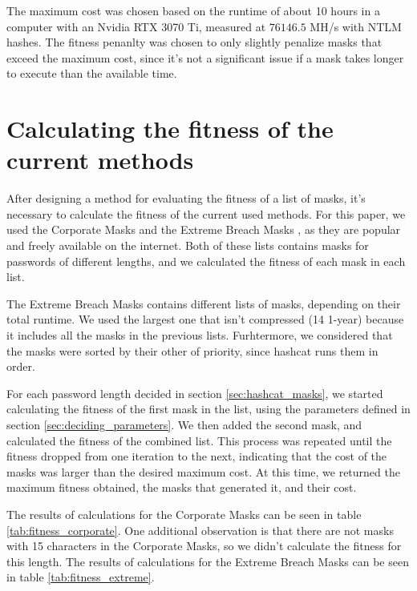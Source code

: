 \documentclass[sigconf,authordraft]{acmart}
\begin{document}
The maximum cost was chosen based on the runtime of about 10 hours in a computer with an Nvidia RTX 3070 Ti, measured at $76146.5$ MH/s with NTLM hashes.
The fitness penanlty was chosen to only slightly penalize masks that exceed the maximum cost, since it's not a significant issue if a mask takes longer to execute than the available time.

\section{Calculating the fitness of the current methods}
\label{sec:calculating_baseline_fitness}

After designing a method for evaluating the fitness of a list of masks, it's necessary to calculate the fitness of the current used methods.
For this paper, we used the Corporate Masks \cite{corporate_masks} and the Extreme Breach Masks \cite{extreme_breach_masks}, as they are popular and freely available on the internet.
Both of these lists contains masks for passwords of different lengths, and we calculated the fitness of each mask in each list.

The Extreme Breach Masks contains different lists of masks, depending on their total runtime.
We used the largest one that isn't compressed (14 1-year) because it includes all the masks in the previous lists.
Furhtermore, we considered that the masks were sorted by their other of priority, since hashcat runs them in order.

For each password length decided in section \ref{sec:hashcat_masks}, we started calculating the fitness of the first mask in the list, using the parameters defined in section \ref{sec:deciding_parameters}.
We then added the second mask, and calculated the fitness of the combined list.
This process was repeated until the fitness dropped from one iteration to the next, indicating that the cost of the masks was larger than the desired maximum cost.
At this time, we returned the maximum fitness obtained, the masks that generated it, and their cost.

The results of calculations for the Corporate Masks can be seen in table \ref{tab:fitness_corporate}.
One additional observation is that there are not masks with 15 characters in the Corporate Masks, so we didn't calculate the fitness for this length.
The results of calculations for the Extreme Breach Masks can be seen in table \ref{tab:fitness_extreme}.
\end{document}
